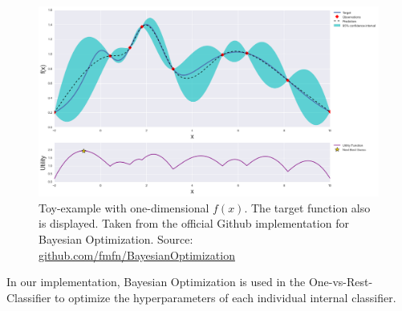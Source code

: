 \begin{figure}[H]
	\begin{center}
		\includegraphics[width=\textwidth]{images/bayesian_optimization_example.png}
		\caption{Toy-example with one-dimensional $f(x)$. The target function also is displayed. Taken from the official Github implementation for Bayesian Optimization. Source: \href{https://github.com/fmfn/BayesianOptimization}{github.com/fmfn/BayesianOptimization}}
		\label{abb:bayes_opt_example}
	\end{center}		
\end{figure}
In our implementation, Bayesian Optimization is used in the One-vs-Rest-Classifier to optimize the hyperparameters of each individual internal classifier. 
